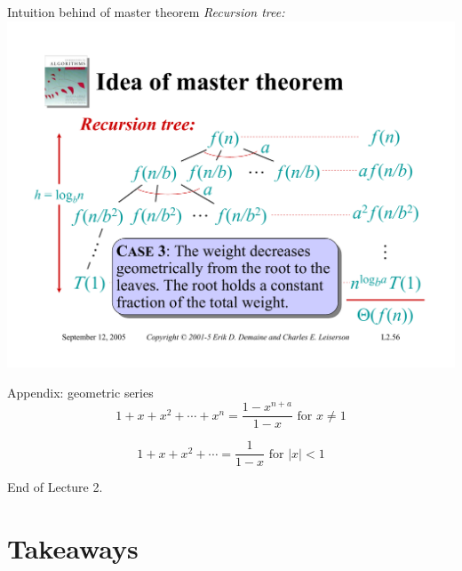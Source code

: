 \documentclass{beamer}
\begin{document}
\begin{frame}{Intuition behind of master theorem}
    \textit{Recursion tree:}\\
    \vspace{5mm}
    \includegraphics[width=\textwidth, trim={1.10cm 1.20cm 0.30cm 5.50cm}, clip]{pages/lec2_56}
\end{frame}

\begin{frame}{Appendix: geometric series}
    $$
        1 + x + x^2 + \cdots + x^n = \frac{1 - x^{n + a}}{1 - x} \text{ for } x \neq 1
    $$
    
    $$
        1 + x + x^2 + \cdots = \frac{1}{1 - x} \text{ for } |x| < 1
    $$
\end{frame}

\begin{frame}{}
    \centering
    \Huge End of Lecture 2.
\end{frame}

\section*{Takeaways}
\end{document}
